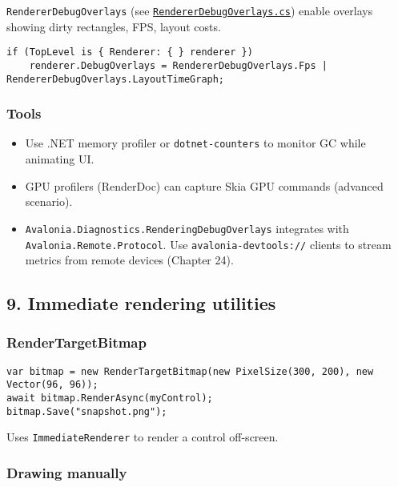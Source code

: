 \passthrough{\lstinline!RendererDebugOverlays!} (see
\href{https://github.com/AvaloniaUI/Avalonia/blob/master/src/Avalonia.Base/Rendering/RendererDebugOverlays.cs}{\passthrough{\lstinline!RendererDebugOverlays.cs!}})
enable overlays showing dirty rectangles, FPS, layout costs.

\begin{lstlisting}
if (TopLevel is { Renderer: { } renderer })
    renderer.DebugOverlays = RendererDebugOverlays.Fps | RendererDebugOverlays.LayoutTimeGraph;
\end{lstlisting}

\subsubsection{Tools}\label{tools}

\begin{itemize}
\tightlist
\item
  Use .NET memory profiler or \passthrough{\lstinline!dotnet-counters!}
  to monitor GC while animating UI.
\item
  GPU profilers (RenderDoc) can capture Skia GPU commands (advanced
  scenario).
\item
  \passthrough{\lstinline!Avalonia.Diagnostics.RenderingDebugOverlays!}
  integrates with \passthrough{\lstinline!Avalonia.Remote.Protocol!}.
  Use \passthrough{\lstinline!avalonia-devtools://!} clients to stream
  metrics from remote devices (Chapter 24).
\end{itemize}

\subsection{9. Immediate rendering
utilities}\label{immediate-rendering-utilities}

\subsubsection{RenderTargetBitmap}\label{rendertargetbitmap}

\begin{lstlisting}
var bitmap = new RenderTargetBitmap(new PixelSize(300, 200), new Vector(96, 96));
await bitmap.RenderAsync(myControl);
bitmap.Save("snapshot.png");
\end{lstlisting}

Uses \passthrough{\lstinline!ImmediateRenderer!} to render a control
off-screen.

\subsubsection{Drawing manually}\label{drawing-manually}

